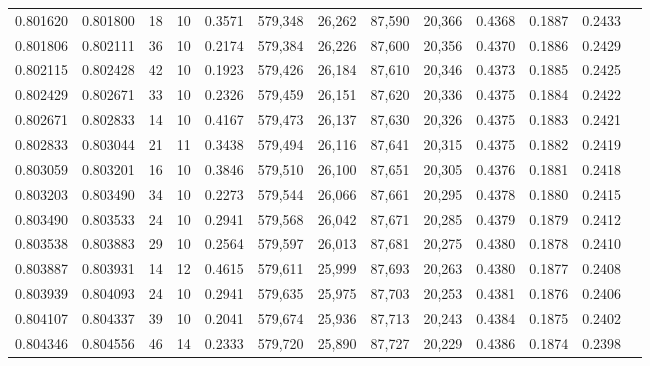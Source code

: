 \begin{tabular}{rrrrrrrrrrrrr}
0.801620 & 0.801800 &    18 &  10 &                                     0.3571 & 579,348 &  26,262 &  87,590 &  20,366 & 0.4368 & 0.1887 & 0.2433 \\
0.801806 & 0.802111 &    36 &  10 &                                     0.2174 & 579,384 &  26,226 &  87,600 &  20,356 & 0.4370 & 0.1886 & 0.2429 \\
0.802115 & 0.802428 &    42 &  10 &                                     0.1923 & 579,426 &  26,184 &  87,610 &  20,346 & 0.4373 & 0.1885 & 0.2425 \\
0.802429 & 0.802671 &    33 &  10 &                                     0.2326 & 579,459 &  26,151 &  87,620 &  20,336 & 0.4375 & 0.1884 & 0.2422 \\
0.802671 & 0.802833 &    14 &  10 &                                     0.4167 & 579,473 &  26,137 &  87,630 &  20,326 & 0.4375 & 0.1883 & 0.2421 \\
0.802833 & 0.803044 &    21 &  11 &                                     0.3438 & 579,494 &  26,116 &  87,641 &  20,315 & 0.4375 & 0.1882 & 0.2419 \\
0.803059 & 0.803201 &    16 &  10 &                                     0.3846 & 579,510 &  26,100 &  87,651 &  20,305 & 0.4376 & 0.1881 & 0.2418 \\
0.803203 & 0.803490 &    34 &  10 &                                     0.2273 & 579,544 &  26,066 &  87,661 &  20,295 & 0.4378 & 0.1880 & 0.2415 \\
0.803490 & 0.803533 &    24 &  10 &                                     0.2941 & 579,568 &  26,042 &  87,671 &  20,285 & 0.4379 & 0.1879 & 0.2412 \\
0.803538 & 0.803883 &    29 &  10 &                                     0.2564 & 579,597 &  26,013 &  87,681 &  20,275 & 0.4380 & 0.1878 & 0.2410 \\
0.803887 & 0.803931 &    14 &  12 &                                     0.4615 & 579,611 &  25,999 &  87,693 &  20,263 & 0.4380 & 0.1877 & 0.2408 \\
0.803939 & 0.804093 &    24 &  10 &                                     0.2941 & 579,635 &  25,975 &  87,703 &  20,253 & 0.4381 & 0.1876 & 0.2406 \\
0.804107 & 0.804337 &    39 &  10 &                                     0.2041 & 579,674 &  25,936 &  87,713 &  20,243 & 0.4384 & 0.1875 & 0.2402 \\
0.804346 & 0.804556 &    46 &  14 &                                     0.2333 & 579,720 &  25,890 &  87,727 &  20,229 & 0.4386 & 0.1874 & 0.2398 \\

\end{tabular}
